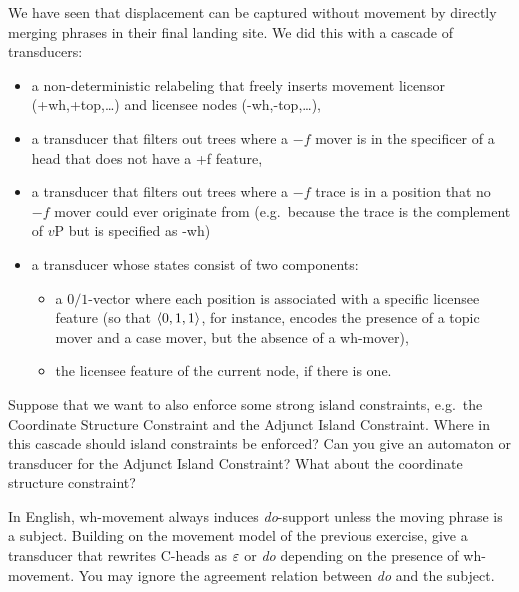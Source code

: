 \begin{exercise}
    We have seen that displacement can be captured without movement by directly merging phrases in their final landing site.
    We did this with a cascade of transducers:
    \begin{itemize}
        \item a non-deterministic relabeling that freely inserts movement licensor (+wh,+top,\ldots) and licensee nodes (-wh,-top,\ldots),
        \item a transducer that filters out trees where a $-f$ mover is in the specificer of a head that does not have a +f feature,
        \item a transducer that filters out trees where a $-f$ trace is in a position that no $-f$ mover could ever originate from (e.g.\ because the trace is the complement of $v$P but is specified as -wh)
        \item a transducer whose states consist of two components:
            \begin{itemize}
                \item a $0/1$-vector where each position is associated with a specific licensee feature (so that $\left \langle 0,1,1 \right \rangle $, for instance, encodes the presence of a topic mover and a case mover, but the absence of a wh-mover),
                \item the licensee feature of the current node, if there is one.
            \end{itemize}
    \end{itemize}
    Suppose that we want to also enforce some strong island constraints, e.g.\ the Coordinate Structure Constraint and the Adjunct Island Constraint.
    Where in this cascade should island constraints be enforced?
    Can you give an automaton or transducer for the Adjunct Island Constraint?
    What about the coordinate structure constraint?
\end{exercise}

\begin{exercise}
    In English, wh-movement always induces \emph{do}-support unless the moving phrase is a subject.
    Building on the movement model of the previous exercise, give a transducer that rewrites C-heads as $\varepsilon$ or \emph{do} depending on the presence of wh-movement.
    You may ignore the agreement relation between \emph{do} and the subject.
\end{exercise}

